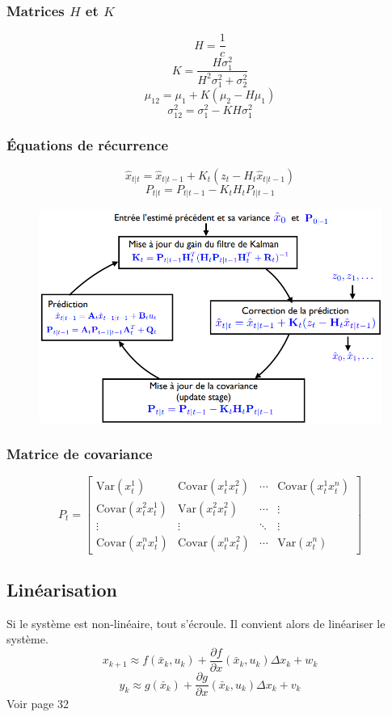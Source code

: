 \documentclass[resume]{subfiles}
\begin{document}
\subsubsection{Matrices $H$ et $K$}
$$H=\frac{1}{c}$$
$$K=\frac{H\sigma_1^2}{H^2\sigma_1^2+\sigma_2^2}$$
$$\mu_{12}=\mu_1+K(\mu_2-H\mu_1)$$
$$\sigma_{12}^2=\sigma_1^2-KH\sigma_1^2$$
\subsubsection{Équations de récurrence}
$$\hat{x}_{t|t}=\hat{x}_{t|t-1}+K_t(z_t-H_t\hat{x}_{t|t-1})$$
$$P_{t|t}=P_{t|t-1}-K_tH_tP_{t|t-1}$$
\begin{figure}[H]
\centering
\includegraphics[width=\columnwidth]{img_22.png}
\end{figure}








\subsubsection{Matrice de covariance}
$$P_t=\begin{bmatrix}
\text{Var}(x_t^{1}) & \text{Covar}(x_t^{1}x_t^{2}) & \cdots & \text{Covar}(x_t^{1}x_t^{n})\\
\text{Covar}(x_t^{2}x_t^{1}) & \text{Var}(x_t^{2}x_t^{2}) & \cdots & \vdots\\
\vdots & \vdots & \ddots & \vdots\\
\text{Covar}(x_t^{n}x_t^{1}) & \text{Covar}(x_t^{n}x_t^{2}) & \cdots & \text{Var}(x_t^{n})
\end{bmatrix}$$
\subsection{Linéarisation}
Si le système est non-linéaire, tout s'écroule. Il convient alors de linéariser le système.
$$x_{k+1}\approx f(\bar{x}_k,u_k)+\frac{\partial f}{\partial x}(\bar{x}_k,u_k)\Delta x_k+w_k$$
$$y_k\approx g(\bar{x}_k)+\frac{\partial g}{\partial x}(\bar{x}_k,u_k)\Delta x_k+v_k$$
Voir page 32
\end{document}
